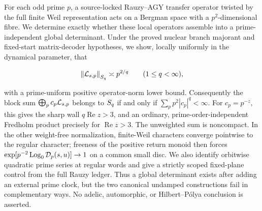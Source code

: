 For each odd prime \(p\), a source-locked Rauzy--AGY transfer operator
twisted by the full finite Weil representation acts on a Bergman space with
a \(p^2\)-dimensional fibre.  We determine exactly whether these local
operators assemble into a prime-independent global determinant.  Under the
proved nuclear branch majorant and fixed-start matrix-decoder hypotheses, we
show, locally uniformly in the dynamical parameter, that

\[
  \left\lVert\mathcal L_{s,p}\right\rVert_{S_{q}}\asymp p^{2/q}
  \qquad (1\leq q<\infty),
\]

with a prime-uniform positive operator-norm lower bound.  Consequently the
block sum \(\bigoplus_p c_p\mathcal L_{s,p}\) belongs to \(S_{q}\) if and
only if \(\sum_p p^2|c_p|^q<\infty\).  For \(c_p=p^{-z}\), this gives the
sharp wall \(q\operatorname{Re}z>3\), and an ordinary, prime-order-independent
Fredholm product precisely for \(\operatorname{Re}z>3\).  The unweighted
sum is noncompact.  In the other weight-free normalization, finite-Weil
characters converge pointwise to the regular character; freeness of the
positive return monoid then forces
\(\exp[p^{-2}\operatorname{Log}_0\mathcal D_p(s,u)]\to1\) on a common small disc.  We also
identify orbitwise quadratic prime series at regular words and give a
strictly scoped fixed-plane control from the full Rauzy ledger.  Thus a
global determinant exists after adding an external prime clock, but the
two canonical undamped constructions fail in complementary ways.  No
adelic, automorphic, or Hilbert--P\'olya conclusion is asserted.
